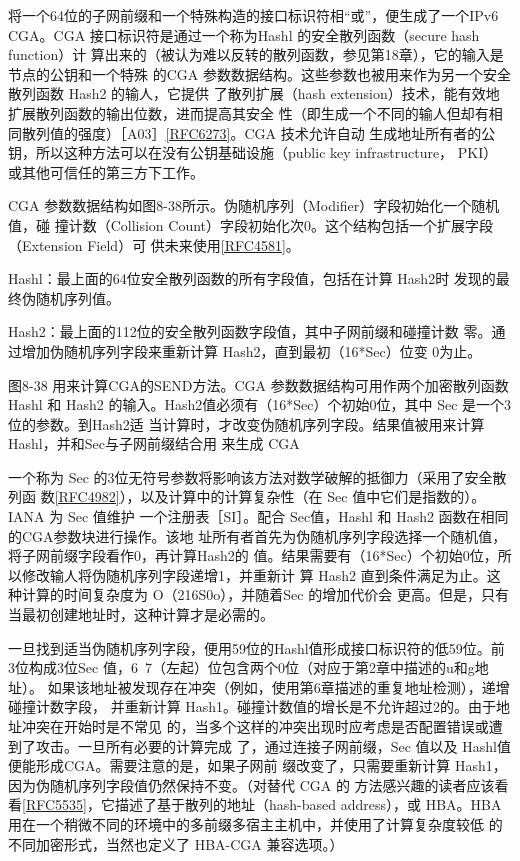 将一个64位的子网前缀和一个特殊构造的接口标识符相“或”，便生成了一个IPv6
CGA。CGA 接口标识符是通过一个称为Hashl 的安全散列函数（secure hash function）计
算出来的（被认为难以反转的散列函数，参见第18章），它的输入是节点的公钥和一个特殊
的CGA 参数数据结构。这些参数也被用来作为另一个安全散列函数 Hash2 的输人，它提供
了散列扩展（hash extension）技术，能有效地扩展散列函数的输出位数，进而提高其安全
性（即生成一个不同的输人但却有相同散列值的强度）［A03］\href{https://www.rfc-editor.org/rfc/rfc6273}{[RFC6273]}。CGA 技术允许自动
生成地址所有者的公钥，所以这种方法可以在没有公钥基础设施（public key infrastructure，
PKI） 或其他可信任的第三方下工作。

CGA 参数数据结构如图8-38所示。伪随机序列（Modifier）字段初始化一个随机值，碰
撞计数（Collision Count）字段初始化次0。这个结构包括一个扩展字段（Extension Field）可
供未来使用\href{https://www.rfc-editor.org/rfc/rfc4581}{[RFC4581]}。

 Hashl：最上面的64位安全散列函数的所有字段值，包括在计算 Hash2时
发现的最终伪随机序列值。

Hash2：最上面的112位的安全散列函数字段值，其中子网前缀和碰撞计数
零。通过增加伪随机序列字段来重新计算 Hash2，直到最初（16*Sec）位变
0为止。

图8-38 用来计算CGA的SEND方法。CGA 参数数据结构可用作两个加密散列函数 Hashl 和 Hash2
的输入。Hash2值必须有（16*Sec）个初始0位，其中 Sec 是一个3位的参数。到Hash2适
当计算时，才改变伪随机序列字段。结果值被用来计算 Hashl，并和Sec与子网前缀结合用
来生成 CGA

一个称为 Sec 的3位无符号参数将影响该方法对数学破解的抵御力（采用了安全散列函
数\href{https://www.rfc-editor.org/rfc/rfc4982}{[RFC4982]}），以及计算中的计算复杂性（在 Sec 值中它们是指数的）。IANA 为 Sec 值维护
一个注册表［SI］。配合 Sec值，Hashl 和 Hash2 函数在相同的CGA参数块进行操作。该地
址所有者首先为伪随机序列字段选择一个随机值，将子网前缀字段看作0，再计算Hash2的
值。结果需要有（16*Sec）个初始0位，所以修改输人将伪随机序列字段递增1，并重新计
算 Hash2 直到条件满足为止。这种计算的时间复杂度为 O（216S0o），并随着Sec 的增加代价会
更高。但是，只有当最初创建地址时，这种计算才是必需的。

一旦找到适当伪随机序列字段，便用59位的Hashl值形成接口标识符的低59位。前
3位构成3位Sec 值，6~7（左起）位包含两个0位（对应于第2章中描述的u和g地址）。
如果该地址被发现存在冲突（例如，使用第6章描述的重复地址检测），递增碰撞计数字段，
并重新计算 Hash1。碰撞计数值的增长是不允许超过2的。由于地址冲突在开始时是不常见
的，当多个这样的冲突出现时应考虑是否配置错误或遭到了攻击。一旦所有必要的计算完成
了，通过连接子网前缀，Sec 值以及 Hashl值便能形成CGA。需要注意的是，如果子网前
缀改变了，只需要重新计算 Hash1，因为伪随机序列字段值仍然保持不变。（对替代 CGA 的
方法感兴趣的读者应该看看\href{https://www.rfc-editor.org/rfc/rfc5535}{[RFC5535]}，它描述了基于散列的地址（hash-based address），或
HBA。HBA 用在一个稍微不同的环境中的多前缀多宿主主机中，并使用了计算复杂度较低
的不同加密形式，当然也定义了 HBA-CGA 兼容选项。）


